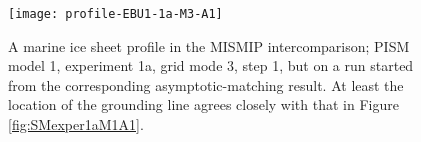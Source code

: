 \begin{figure}[ht]
\texttt{[image: profile-EBU1-1a-M3-A1]}
\caption{A marine ice sheet profile in the MISMIP intercomparison; PISM model 1, experiment 1a, grid mode 3, step 1, but on a run started from the corresponding asymptotic-matching result.  At least the location of the grounding line agrees closely with that in Figure \ref{fig:SMexper1aM1A1}.}
\label{fig:MISMIPmodel1exper1aM3A1FROMSM}
\end{figure}


